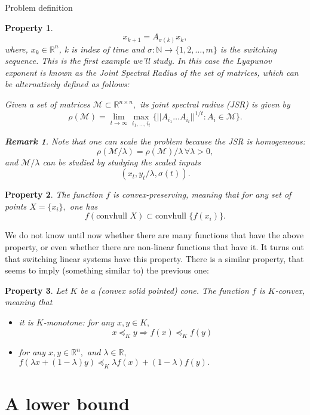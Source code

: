 \documentclass[letterpaper,11pt]{paper}
\newcommand{\convhull}{\mbox{convhull } }
\newcommand{\R}{\mathbb{R} }
\newcommand{\N}{\mathbb{N} }
\newcommand{\conv}{\convhull }
\newcommand{\re}{\mathbb{R}}
\newcommand{\cM}{\mathcal{M}}
\newtheorem{remark}{Remark}[section]
\newtheorem{property}{Property}[section]
\newenvironment{definition}[1][Definition]{\begin{trivlist}
\item[\hskip \labelsep {\bfseries #1}]}{\end{trivlist}}
\begin{document}
\begin{section}{Problem definition}
\begin{property}
\begin{equation}\label{switchedSystem}x_{k+1} = A_{\sigma(k)}x_k,
\end{equation}
where, $x_k \in \R^n$, k is index of time and $\sigma: \N \to \{1,2, \ldots, m\}$ is the switching sequence.  This is the first example we'll study.
In this case the Lyapunov exponent is known as the Joint Spectral Radius of the set of matrices, which can be alternatively defined as follows:
\begin{definition}  \cite{jungers_lncis} Given a set of matrices $\cM \subset \re^{n\times n},$ its \emph{joint spectral radius} (JSR) is given by
$$\rho(\cM) =\lim_{t\rightarrow \infty} \max_{i_1,\dots, i_t}\{||A_{i_1} \dots A_{i_t}||^{1/t}: A_i\in\cM\}. $$
\end{definition}
\begin{remark}
 Note that one can scale the problem because the JSR is homogeneous:
$$\rho(\cM/\lambda)=\rho(\cM)/\lambda\, \forall \lambda>0, $$ and $\cM/\lambda$ can be studied by studying the scaled inputs $$(x_t, y_t/\lambda,\sigma(t)).$$
\end{remark}
\end{property}
\begin{property}\label{property:convpres}
 The function $f$ is \emph{convex-preserving,} meaning that for any set of points $X=\{x_i\},$ one has
$$ f(\conv{X})\subset \conv\{f(x_i)\}. $$
\end{property}
We do not know until now whether there are many functions that have the above property, or even whether there are non-linear functions that have it. It turns out that switching linear systems have this property. There is a similar property, that seems to imply (something similar to) the previous one:
\begin{property}\label{property:kconvexity} \cite{VaB:96}Let $K$ be a (convex solid pointed) cone. The function $f$ is \emph{$K$-convex,}  meaning that \begin{itemize} \item it is $K$-monotone: for any $x,y\in K,$ $$x\preceq_K y \Rightarrow f( x )\preceq_K  f(y)$$ \item for any $x,y\in \re^n,$ and $\lambda \in \re,$ $f(\lambda x + (1-\lambda)y)\preceq_K \lambda f(x) + (1-\lambda)f(y).$ \end{itemize}
\end{property}

\end{section}

\section{A lower bound}
\end{document}
